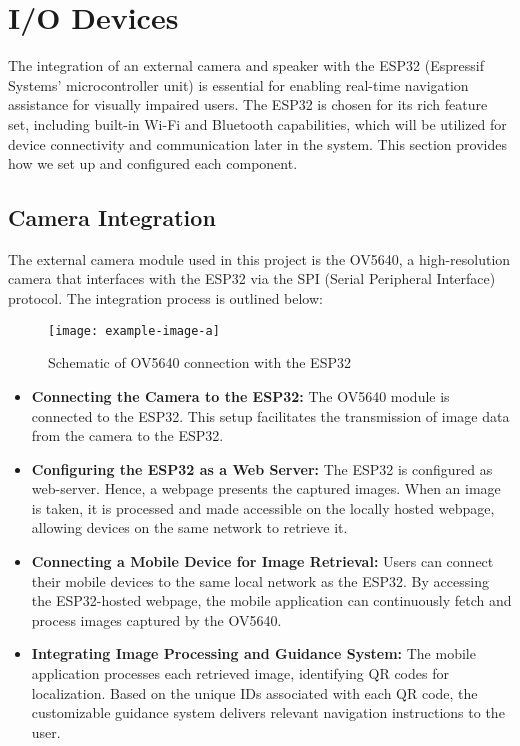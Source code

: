
\section{I/O Devices}

The integration of an external camera and speaker with the ESP32 (Espressif Systems' microcontroller unit) is essential for enabling real-time navigation assistance for visually impaired users. The ESP32 is chosen for its rich feature set, including built-in Wi-Fi and Bluetooth capabilities, which will be utilized for device connectivity and communication later in the system. This section provides how we set up and configured each component. 

\subsection{Camera Integration}

The external camera module used in this project is the OV5640, a high-resolution camera that interfaces with the ESP32 via the SPI (Serial Peripheral Interface) protocol. The integration process is outlined below:

\begin{figure}[h!]
	\centering
	\texttt{[image: example-image-a]}
	\caption{Schematic of OV5640 connection with the ESP32}
	\label{fig:camera_schematics}
\end{figure}

\begin{itemize}
	\item \textbf{Connecting the Camera to the ESP32:} The OV5640 module is connected to the ESP32. This setup facilitates the transmission of image data from the camera to the ESP32. 
	
	\item \textbf{Configuring the ESP32 as a Web Server:} The ESP32 is configured as web-server. Hence, a webpage  presents the captured images. When an image is taken, it is processed and made accessible on the locally hosted webpage, allowing devices on the same network to retrieve it.
	
	\item \textbf{Connecting a Mobile Device for Image Retrieval:} Users can connect their mobile devices to the same local network as the ESP32. By accessing the ESP32-hosted webpage, the mobile application can continuously fetch and process images captured by the OV5640.
	
	\item \textbf{Integrating Image Processing and Guidance System:} The mobile application processes each retrieved image, identifying QR codes for localization. Based on the unique IDs associated with each QR code, the customizable guidance system delivers relevant navigation instructions to the user.
\end{itemize}

